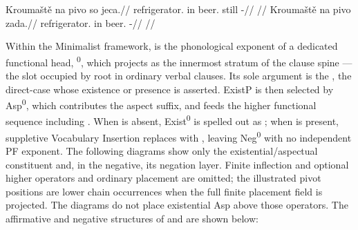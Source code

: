 \pex
\a
\begingl
\gla Kroumaště na pivo so jeca.//
\glb refrigerator.\Ind{} in beer.\Dir{} still \Exst{}-\Cont{}//
\glft {}//
\endgl
\a
\begingl
\gla Kroumaště na pivo zada.//
\glb refrigerator.\Ind{} in beer.\Dir{} \NegExst{}-\Cont{}//
\glft {}//
\endgl
\xe

Within the Minimalist framework,  is the phonological exponent of a
dedicated functional head, \textsuperscript{0}, which projects
 as the innermost stratum of the clause spine --- the slot occupied
by root  in ordinary verbal clauses. Its sole argument is the , the direct-case
 whose existence or presence is asserted. ExistP is then
selected by Asp\textsuperscript{0}, which contributes the aspect suffix, and
feeds the higher functional sequence including . When
 is absent, Exist\textsuperscript{0} is spelled out as ;
when  is present, suppletive Vocabulary Insertion replaces
 with , leaving Neg\textsuperscript{0} with no independent
PF exponent. The following diagrams show only the existential/aspectual constituent and,
in the negative, its negation layer. Finite inflection and optional higher
operators and ordinary placement are omitted; the illustrated pivot
positions are lower chain occurrences when the full finite placement field
is projected. The diagrams do not place existential Asp above those operators. The affirmative and negative structures of  and
 are shown below:

